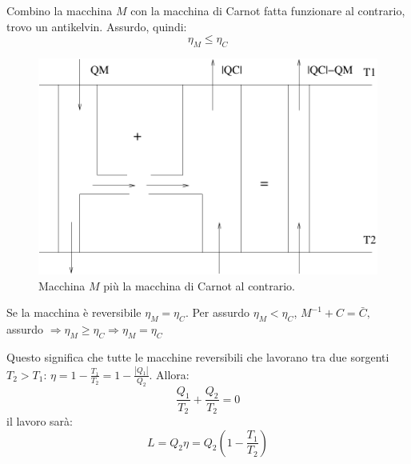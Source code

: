 Combino la macchina $M$ con la macchina di Carnot fatta funzionare al contrario, trovo un antikelvin. Assurdo, quindi: \[\eta_M\leq\eta_C\]
\begin{figure}[htbp]
   \centering
   \includegraphics[scale=0.5]{immagini/fisica1/M+c-1}
   \caption{Macchina $M$ più la macchina di Carnot al contrario.}
\end{figure}

\begin{Cor}
   Se la macchina è reversibile $\eta_M=\eta_C$. Per assurdo $\eta_M<\eta_C$, $M^{-1}+C=\bar{C},$ assurdo $\Rightarrow \eta_M\geq\eta_C\Rightarrow \eta_M=\eta_C$
\end{Cor}

Questo significa che tutte le macchine reversibili che lavorano tra due sorgenti $T_2 > T_1$: $\eta = 1-\frac{T_1}{T_2} = 1 - \frac{|Q_1|}{Q_2}$. Allora:
\begin{equation}
   \frac{Q_1}{T_2} + \frac{Q_2}{T_2} = 0
\end{equation}
il lavoro sarà:
\begin{equation}
   L = Q_2\eta = Q_2 \left(1 - \frac{T_1}{T_2}\right)
\end{equation}




